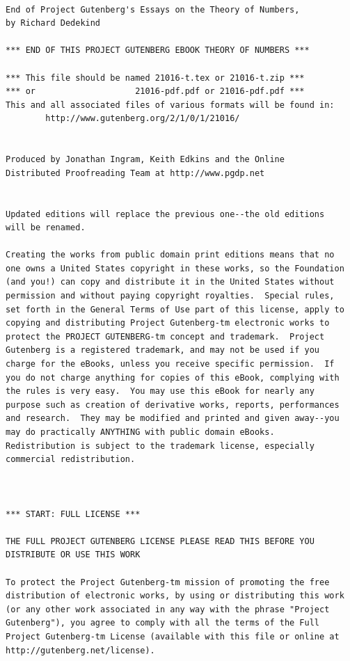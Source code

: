 \documentclass[oneside]{book}
\begin{document}
\newpage
\small
{}
\begin{verbatim}

End of Project Gutenberg's Essays on the Theory of Numbers,
by Richard Dedekind

*** END OF THIS PROJECT GUTENBERG EBOOK THEORY OF NUMBERS ***

*** This file should be named 21016-t.tex or 21016-t.zip ***
*** or                    21016-pdf.pdf or 21016-pdf.pdf ***
This and all associated files of various formats will be found in:
        http://www.gutenberg.org/2/1/0/1/21016/


Produced by Jonathan Ingram, Keith Edkins and the Online
Distributed Proofreading Team at http://www.pgdp.net


Updated editions will replace the previous one--the old editions
will be renamed.

Creating the works from public domain print editions means that no
one owns a United States copyright in these works, so the Foundation
(and you!) can copy and distribute it in the United States without
permission and without paying copyright royalties.  Special rules,
set forth in the General Terms of Use part of this license, apply to
copying and distributing Project Gutenberg-tm electronic works to
protect the PROJECT GUTENBERG-tm concept and trademark.  Project
Gutenberg is a registered trademark, and may not be used if you
charge for the eBooks, unless you receive specific permission.  If
you do not charge anything for copies of this eBook, complying with
the rules is very easy.  You may use this eBook for nearly any
purpose such as creation of derivative works, reports, performances
and research.  They may be modified and printed and given away--you
may do practically ANYTHING with public domain eBooks.
Redistribution is subject to the trademark license, especially
commercial redistribution.



*** START: FULL LICENSE ***

THE FULL PROJECT GUTENBERG LICENSE PLEASE READ THIS BEFORE YOU
DISTRIBUTE OR USE THIS WORK

To protect the Project Gutenberg-tm mission of promoting the free
distribution of electronic works, by using or distributing this work
(or any other work associated in any way with the phrase "Project
Gutenberg"), you agree to comply with all the terms of the Full
Project Gutenberg-tm License (available with this file or online at
http://gutenberg.net/license).



\end{verbatim}
\end{document}
